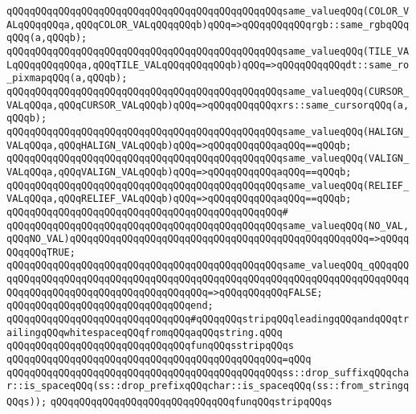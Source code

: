 \verb|qQQqqQQqqQQqqQQqqQQqqQQqqQQqqQQqqQQqqQQqqQQqqQQqsame_valueqQQq(COLOR_VALqQQqqQQqa,qQQqCOLOR_VALqQQqqQQqb)qQQq=>qQQqqQQqqQQqrgb::same_rgbqQQqqQQq(a,qQQqb);|\newline
\verb|qQQqqQQqqQQqqQQqqQQqqQQqqQQqqQQqqQQqqQQqqQQqqQQqsame_valueqQQq(TILE_VALqQQqqQQqqQQqa,qQQqTILE_VALqQQqqQQqqQQqb)qQQq=>qQQqqQQqqQQqdt::same_ro_pixmapqQQq(a,qQQqb);|\newline
\verb|qQQqqQQqqQQqqQQqqQQqqQQqqQQqqQQqqQQqqQQqqQQqqQQqsame_valueqQQq(CURSOR_VALqQQqa,qQQqCURSOR_VALqQQqb)qQQq=>qQQqqQQqqQQqxrs::same_cursorqQQq(a,qQQqb);|\newline
\verb|qQQqqQQqqQQqqQQqqQQqqQQqqQQqqQQqqQQqqQQqqQQqqQQqsame_valueqQQq(HALIGN_VALqQQqa,qQQqHALIGN_VALqQQqb)qQQq=>qQQqqQQqqQQqaqQQq==qQQqb;|\newline
\verb|qQQqqQQqqQQqqQQqqQQqqQQqqQQqqQQqqQQqqQQqqQQqqQQqsame_valueqQQq(VALIGN_VALqQQqa,qQQqVALIGN_VALqQQqb)qQQq=>qQQqqQQqqQQqaqQQq==qQQqb;|\newline
\verb|qQQqqQQqqQQqqQQqqQQqqQQqqQQqqQQqqQQqqQQqqQQqqQQqsame_valueqQQq(RELIEF_VALqQQqa,qQQqRELIEF_VALqQQqb)qQQq=>qQQqqQQqqQQqaqQQq==qQQqb;|\newline
\verb|qQQqqQQqqQQqqQQqqQQqqQQqqQQqqQQqqQQqqQQqqQQqqQQq#|\newline
\verb|qQQqqQQqqQQqqQQqqQQqqQQqqQQqqQQqqQQqqQQqqQQqqQQqsame_valueqQQq(NO_VAL,qQQqNO_VAL)qQQqqQQqqQQqqQQqqQQqqQQqqQQqqQQqqQQqqQQqqQQqqQQqqQQq=>qQQqqQQqqQQqTRUE;|\newline
\verb|qQQqqQQqqQQqqQQqqQQqqQQqqQQqqQQqqQQqqQQqqQQqqQQqsame_valueqQQq_qQQqqQQqqQQqqQQqqQQqqQQqqQQqqQQqqQQqqQQqqQQqqQQqqQQqqQQqqQQqqQQqqQQqqQQqqQQqqQQqqQQqqQQqqQQqqQQqqQQqqQQqqQQqqQQq=>qQQqqQQqqQQqFALSE;|\newline
\verb|qQQqqQQqqQQqqQQqqQQqqQQqqQQqqQQqend;|\newline
\newline
\verb|qQQqqQQqqQQqqQQqqQQqqQQqqQQqqQQq#qQQqqQQqstripqQQqleadingqQQqandqQQqtrailingqQQqwhitespaceqQQqfromqQQqaqQQqstring.qQQq|\newline
\newline
\verb|qQQqqQQqqQQqqQQqqQQqqQQqqQQqqQQqfunqQQqsstripqQQqs|\newline
\verb|qQQqqQQqqQQqqQQqqQQqqQQqqQQqqQQqqQQqqQQqqQQqqQQq=qQQq|\newline
\verb|qQQqqQQqqQQqqQQqqQQqqQQqqQQqqQQqqQQqqQQqqQQqqQQqss::drop_suffixqQQqchar::is_spaceqQQq(ss::drop_prefixqQQqchar::is_spaceqQQq(ss::from_stringqQQqs));|\newline
\newline
\verb|qQQqqQQqqQQqqQQqqQQqqQQqqQQqqQQqfunqQQqstripqQQqs|\newline
